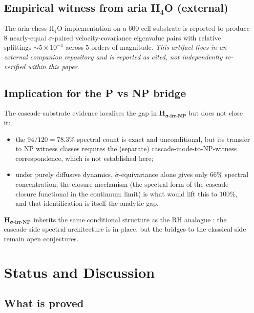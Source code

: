 \documentclass[11pt, a4paper]{amsart}
\theoremstyle{definition}
\begin{document}
\subsection{Empirical witness from aria H$_4$O (external)}

The aria-chess H$_4$O implementation \cite{ariaH4Olaw} on a
600-cell substrate is reported to produce $8$ nearly-equal
$\sigma$-paired velocity-covariance eigenvalue pairs with relative
splittings $\sim 5\times 10^{-4}$ across $5$ orders of magnitude.
\emph{This artifact lives in an external companion repository and
is reported as cited, not independently re-verified within this
paper.}

\subsection{Implication for the P vs NP bridge}

The cascade-substrate evidence localises the gap in
$\mathbf{H_{\sigma\text{-irr-NP}}}$ but does not close it:
\begin{itemize}
\item the $94/120 = 78.3\%$ spectral count is exact and
unconditional, but its transfer to NP witness classes requires the
(separate) cascade-mode-to-NP-witness correspondence, which is not
established here;
\item under purely diffusive dynamics, $\widetilde\sigma$-equivariance
alone gives only $66\%$ spectral concentration; the closure
mechanism (the spectral form of the cascade closure functional in
the continuum limit) is what would lift this to $100\%$, and that
identification is itself the analytic gap.
\end{itemize}
$\mathbf{H_{\sigma\text{-irr-NP}}}$ inherits the same conditional
structure as the RH analogue
\cite[Remark rmk:strengthened]{CascadeRHformal}: the cascade-side
spectral architecture is in place, but the bridges to the classical
side remain open conjectures.

\section{Status and Discussion}

\subsection{What is proved}
\end{document}
